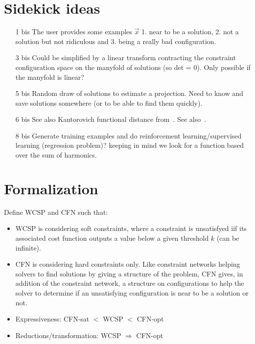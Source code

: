 \documentclass[a4paper, 12pt]{article}
\begin{document}
\section{Sidekick ideas}
\begin{itemize}
\item[1 bis] The user provides some examples $\vec{x}$ 1. near to be a solution, 2. not a solution but not ridiculous and 3. being a really bad configuration.
\item[3 bis] Could be simplified by a linear transform contracting the constraint configuration space on the manyfold of solutions (so det = 0). Only possible if the manyfold is linear?
\item[5 bis] Random draw of solutions to estimate a projection. Need to know and save solutions somewhere (or to be able to find them quickly).
\item [6 bis] See also Kantorovich functional distance from~\cite{StochCP}. See also~\cite{metrics}.
\item [8 bis] Generate training examples and do reinforcement learning/supervised learning (regression problem)? keeping in mind we look for a function based over the sum of harmonics.
\end{itemize}

\section{Formalization}
Define WCSP and CFN such that:
\begin{itemize}
\item  WCSP is  considering soft  constraints, where  a constraint  is
  unsatisfyed iif its associated cost function outputs a value below a
  given threshold $k$ (can be infinite).
\item  CFN  is  considering  hard constraints  only.  Like  constraint
  networks helping solvers to find  solutions by giving a structure of
  the problem,  CFN gives,  in addition of  the constraint  network, a
  structure on  configurations to help  the solver to determine  if an
  unsatisfying configuration is near to be a solution or not.
\item Expressiveness: CFN-sat $<$ WCSP $<$ CFN-opt
\item Reductions/transformation: WCSP $\Rightarrow$ CFN-opt
\end{itemize}
\end{document}
